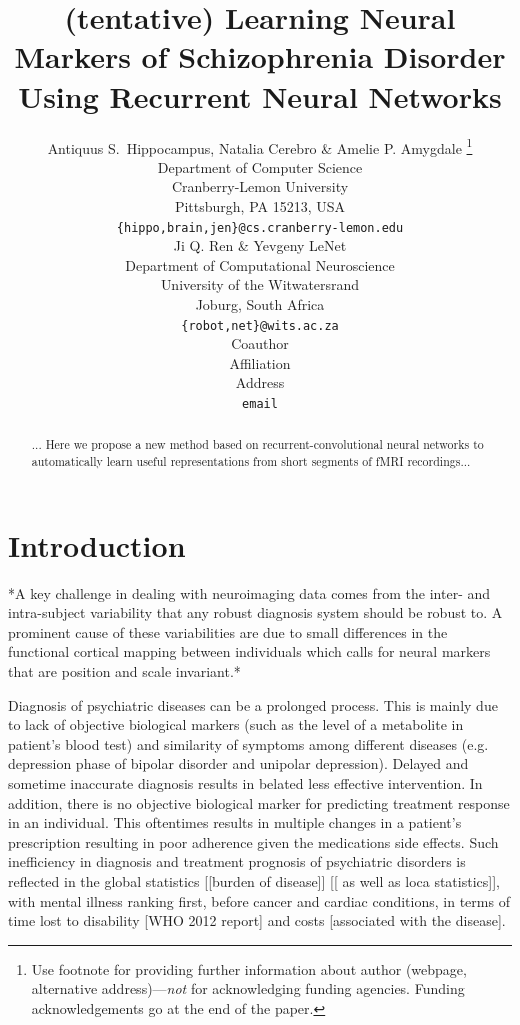 \documentclass{article} %
\title{(tentative) Learning Neural Markers of Schizophrenia Disorder Using Recurrent Neural Networks}
\author{Antiquus S.~Hippocampus, Natalia Cerebro \& Amelie P. Amygdale \thanks{ Use footnote for providing further information
about author (webpage, alternative address)---\emph{not} for acknowledging
funding agencies.  Funding acknowledgements go at the end of the paper.} \\
Department of Computer Science\\
Cranberry-Lemon University\\
Pittsburgh, PA 15213, USA \\
\texttt{\{hippo,brain,jen\}@cs.cranberry-lemon.edu} \\
\And
Ji Q. Ren \& Yevgeny LeNet \\
Department of Computational Neuroscience \\
University of the Witwatersrand \\
Joburg, South Africa \\
\texttt{\{robot,net\}@wits.ac.za} \\
\AND
Coauthor \\
Affiliation \\
Address \\
\texttt{email}
}
\begin{document}
\maketitle


\begin{abstract}
... Here we propose a new method based on recurrent-convolutional neural networks to automatically learn useful representations from short segments of fMRI recordings...
\end{abstract}

\section{Introduction}
*A key challenge in dealing with neuroimaging data comes from the inter- and intra-subject variability that any robust diagnosis system should be robust to. A prominent cause of these variabilities are due to small differences in the functional cortical mapping between individuals which calls for neural markers that are position and scale invariant.*

Diagnosis of psychiatric diseases can be a prolonged process. This is mainly due to lack of objective biological markers (such as the level of a metabolite in patient’s blood test) and similarity of symptoms among different diseases (e.g. depression phase of bipolar disorder and unipolar depression). Delayed and sometime inaccurate diagnosis results in belated less effective intervention. In addition, there is no objective biological marker for predicting treatment response in an individual. This oftentimes results in multiple changes in a patient’s prescription resulting in poor adherence given the medications side effects. Such inefficiency in diagnosis and treatment prognosis of psychiatric disorders is reflected in the global statistics [[burden of disease]] [[ as well as loca statistics]], with mental illness ranking first, before cancer and cardiac conditions, in terms of time lost to disability [WHO 2012 report] and costs \citep{Roehrig2016} [associated with the disease]. 
\end{document}
